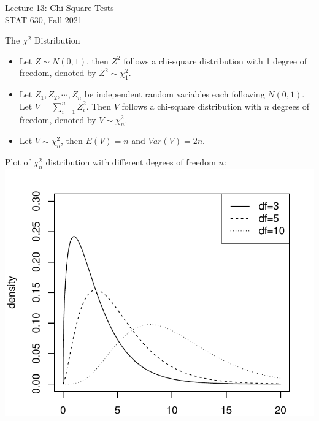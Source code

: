 \documentclass[10pt]{beamer}
\begin{document}
\begin{frame}
\large Lecture 13: Chi-Square Tests\\
STAT 630, Fall 2021
\end{frame}

\begin{frame}{The $\chi^2$ Distribution}
\begin{itemize}
\item Let $Z \sim N(0,1)$, then $Z^2$ follows a chi-square distribution with 1 degree of freedom, denoted by $Z^2 \sim \chi^2_1$.
\vspace{10pt}
\item Let $Z_1, Z_2, \cdots, Z_n$ be independent random variables each following $N(0,1)$.  Let $V = \sum_{i=1}^n Z_i^2$.  Then $V$ follows a chi-square distribution with $n$ degrees of freedom, denoted by $V\sim \chi^2_n$.  
\vspace{10pt}
\item Let $V \sim \chi^2_n$, then $E(V) = n$ and $Var(V) = 2n$.  
\end{itemize}
\end{frame}

\begin{frame}
Plot of $\chi^2_n$ distribution with different degrees of freedom $n$:
\includegraphics[scale=0.6]{chi.pdf}
\end{frame}
\end{document}
